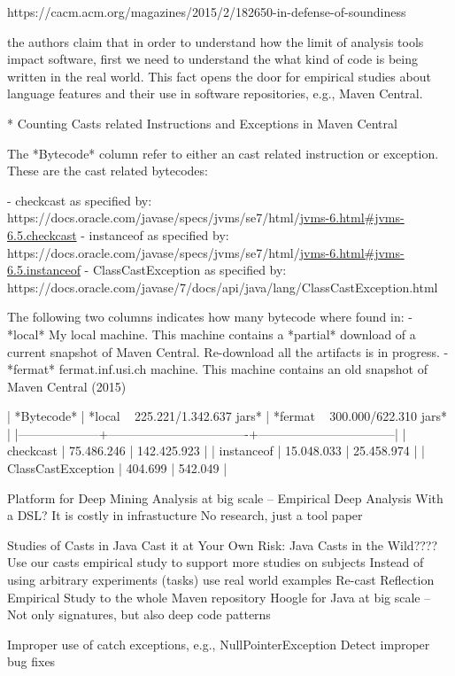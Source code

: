 https://cacm.acm.org/magazines/2015/2/182650-in-defense-of-soundiness

the authors claim that in order to understand how the limit of analysis tools impact software,
first we need to understand the what kind of code is being written in the real world.
This fact opens the door for empirical studies about language features and their use in
software repositories, e.g., Maven Central.


* Counting Casts related Instructions and Exceptions in Maven Central

The *Bytecode* column refer to either an cast related instruction or exception.
These are the cast related bytecodes:

- checkcast as specified by:
https://docs.oracle.com/javase/specs/jvms/se7/html/\url{jvms-6.html#jvms-6.5.checkcast}
- instanceof as specified by:
https://docs.oracle.com/javase/specs/jvms/se7/html/\url{jvms-6.html#jvms-6.5.instanceof}
- ClassCastException as specified by:
https://docs.oracle.com/javase/7/docs/api/java/lang/ClassCastException.html

The following two columns indicates how many bytecode where found in:
- *local*
My local machine.
This machine contains a *partial* download of a current snapshot of Maven Central.
Re-download all the artifacts is in progress.
- *fermat*
fermat.inf.usi.ch machine.
This machine contains an old snapshot of Maven Central (2015)

| *Bytecode*         | *local ~ 225.221/1.342.637 jars* | *fermat ~ 300.000/622.310 jars* |
|--------------------+----------------------------------+---------------------------------|
| checkcast          |                       75.486.246 |                     142.425.923 |
| instanceof         |                       15.048.033 |                      25.458.974 |
| ClassCastException |                          404.699 |                         542.049 |

Platform for Deep Mining Analysis at big scale -- Empirical Deep Analysis
With a DSL?
It is costly in infrastucture
No research, just a tool paper

Studies of Casts in Java
Cast it at Your Own Risk: Java Casts in the Wild????
Use our casts empirical study to support more studies on subjects
Instead of using arbitrary experiments (tasks) use real world examples
Re-cast Reflection Empirical Study to the whole Maven repository
Hoogle for Java at big scale -- Not only signatures, but also deep code patterns

Improper use of catch exceptions, e.g., NullPointerException
Detect improper bug fixes


